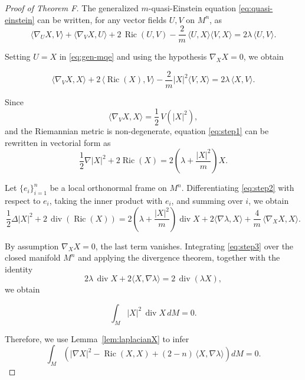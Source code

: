 \documentclass[a4paper, 12pt]{amsart}
\theoremstyle{definition}
\numberwithin{figure}{section}
\begin{document}
\begin{proof}[Proof of Theorem F]
The generalized $m$-quasi-Einstein equation \eqref{eq:quasi-einstein} can be written,
for any vector fields $U,V$ on $M^n$, as
\begin{equation}\label{eq:gen-mqe}
\langle \nabla_U X, V \rangle + \langle \nabla_V X, U \rangle
+ 2\,\operatorname{Ric}(U,V)
- \frac{2}{m}\, \langle U,X\rangle \langle V,X\rangle
= 2\lambda\, \langle U,V\rangle .
\end{equation}

Setting $U=X$ in \eqref{eq:gen-mqe} and using the hypothesis
$\nabla_{X}X=0$, we obtain 

\begin{equation}\label{eq:step1}
\langle \nabla_V X, X \rangle
+ 2\,\langle \operatorname{Ric}(X), V \rangle
- \frac{2}{m}\lvert X\rvert^{2} \langle V,X\rangle
= 2\lambda\, \langle X,V\rangle.
\end{equation}

Since
$$
\langle \nabla_V X, X \rangle = \frac{1}{2}\, V(\lvert X\rvert^{2}),
$$
and the Riemannian metric is non-degenerate, equation \eqref{eq:step1}
can be rewritten in vectorial form as
\begin{equation}\label{eq:step2}
\frac{1}{2}\nabla \lvert X\rvert^{2} + 2\operatorname{Ric}(X)
= 2\left(\lambda + \frac{\lvert X\rvert^{2}}{m}\right) X.
\end{equation}

Let $\{e_i\}_{i=1}^n$ be a local orthonormal frame on $M^n$.
Differentiating \eqref{eq:step2} with respect to $e_i$,
taking the inner product with $e_i$, and summing over $i$,
we obtain
\begin{equation}\label{eq:step3}
\frac{1}{2}\Delta |X|^{2}
+ 2\,\operatorname{div}(\operatorname{Ric}(X))
= 2\left(\lambda + \frac{|X|^{2}}{m}\right)\operatorname{div} X
+ 2\langle\nabla\lambda, X\rangle + \frac{4}{m}\,\langle \nabla_{X}X, X\rangle .
\end{equation}

By assumption $\nabla_{X}X=0$, the last term vanishes.
Integrating \eqref{eq:step3} over the closed manifold $M^n$ and applying
the divergence theorem, together with the identity
$$
2\lambda\,\operatorname{div} X
+ 2\langle X, \nabla\lambda\rangle
= 2\,\operatorname{div}(\lambda X),
$$
we obtain

$$
\int_{M} |X|^{2}\, \operatorname{div} X \, dM = 0.
$$

Therefore, we use Lemma~\ref{lem:laplacianX} to infer
$$
\int_M \left(
|\nabla X|^{2}
- \operatorname{Ric}(X,X)
+ (2-n)\,\langle X,\nabla \lambda\rangle
\right) dM = 0 .
$$


\end{proof}
\end{document}
